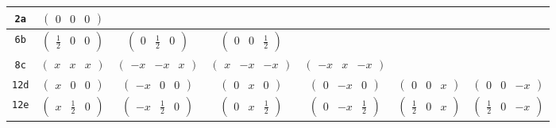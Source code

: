 \documentclass[fleqn,9pt,landscape]{jsarticle}
\begin{document}
\begin{center}
\begin{longtable}{ccccccc}
{\tt 2a} & $ \begin{pmatrix} 0 & 0 & 0 \end{pmatrix} $ & $  $ & $  $ & $  $ & $  $ & $  $ \\ \hline
{\tt 6b} & $ \begin{pmatrix} \frac{1}{2} & 0 & 0 \end{pmatrix} $ & $ \begin{pmatrix} 0 & \frac{1}{2} & 0 \end{pmatrix} $ & $ \begin{pmatrix} 0 & 0 & \frac{1}{2} \end{pmatrix} $ & $  $ & $  $ & $  $ \\ \hline
{\tt 8c} & $ \begin{pmatrix} x & x & x \end{pmatrix} $ & $ \begin{pmatrix} - x & - x & x \end{pmatrix} $ & $ \begin{pmatrix} x & - x & - x \end{pmatrix} $ & $ \begin{pmatrix} - x & x & - x \end{pmatrix} $ & $  $ & $  $ \\ \hline
{\tt 12d} & $ \begin{pmatrix} x & 0 & 0 \end{pmatrix} $ & $ \begin{pmatrix} - x & 0 & 0 \end{pmatrix} $ & $ \begin{pmatrix} 0 & x & 0 \end{pmatrix} $ & $ \begin{pmatrix} 0 & - x & 0 \end{pmatrix} $ & $ \begin{pmatrix} 0 & 0 & x \end{pmatrix} $ & $ \begin{pmatrix} 0 & 0 & - x \end{pmatrix} $ \\ \hline
{\tt 12e} & $ \begin{pmatrix} x & \frac{1}{2} & 0 \end{pmatrix} $ & $ \begin{pmatrix} - x & \frac{1}{2} & 0 \end{pmatrix} $ & $ \begin{pmatrix} 0 & x & \frac{1}{2} \end{pmatrix} $ & $ \begin{pmatrix} 0 & - x & \frac{1}{2} \end{pmatrix} $ & $ \begin{pmatrix} \frac{1}{2} & 0 & x \end{pmatrix} $ & $ \begin{pmatrix} \frac{1}{2} & 0 & - x \end{pmatrix} $ \\ \hline

\end{longtable}
\end{center}
\end{document}
